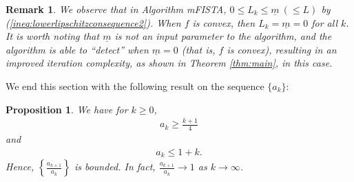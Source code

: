 \documentclass[11pt]{article}
\newtheorem{proposition}[thm]{Proposition}
\newtheorem{remark}[thm]{Remark}
\begin{document}
\begin{remark}\label{rem:mFISTA}
We observe that in Algorithm mFISTA,  $0 \leq L_k \leq \underline{m}\ (\leq L)$ by  (\ref{ineq:lowerlipschitzconsequence2}).  When $f$ is convex, then $L_k = \underline{m} = 0$ for all $k$.  It is worth noting that $\underline{m}$ is not an input parameter to the algorithm, and the algorithm is able to ``detect'' when $\underline{m} = 0$ (that is, $f$ is convex), resulting in an improved iteration complexity, as shown in Theorem \ref{thm:main}, in this case.
\end{remark}

\noindent We end this section with the following result on the sequence $\{ a_{k} \}$:
\begin{proposition}\label{prop:ak}
We have for $k \geq 0$,
\begin{eqnarray}\label{ineq:ak}
a_{k} \geq \frac{k+1}{4}
\end{eqnarray}
and 
\begin{eqnarray}\label{ineq:ak2}
a_{k} \leq 1 + k.
\end{eqnarray}
Hence, $\displaystyle \left\{ \frac{a_{k+1}}{a_{k}} \right\}$ is bounded.  In fact, $\displaystyle \frac{a_{k+1}}{a_{k}} \rightarrow 1$ as $k \rightarrow \infty$.
\end{proposition}
\end{document}
